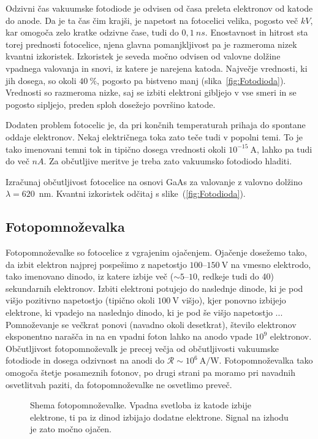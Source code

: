 Odzivni čas vakuumske fotodiode je odvisen od časa preleta elektronov od katode do anode. 
Da je ta čas čim krajši, je napetost na fotocelici velika, pogosto več $\si{kV}$,
kar omogoča zelo kratke odzivne čase, tudi do $0,1~\si{ns}$. 
Enostavnost in hitrost sta torej prednosti fotocelice, 
njena glavna pomanjkljivost pa je razmeroma nizek kvantni izkoristek. 
Izkoristek je seveda močno odvisen od valovne dolžine vpadnega valovanja in snovi, iz 
katere je narejena katoda. Največje vrednosti, ki jih dosega, so okoli $40~\%$, 
pogosto pa bistveno manj (slika~\ref{fig:Fotodioda}). 
Vrednosti so razmeroma nizke, saj se izbiti elektroni gibljejo v vse
smeri in se pogosto sipljejo, preden sploh dosežejo površino katode. 

Dodaten problem fotocelic je, da pri končnih temperaturah prihaja do spontane oddaje elektronov.
Nekaj električnega toka zato teče tudi v popolni temi. To je tako imenovani temni 
tok 
in tipično dosega vrednosti okoli $10^{-15}~\si{\ampere}$, lahko pa tudi do več $\si{nA}$. 
Za občutljive meritve je treba zato vakuumsko fotodiodo hladiti. 

\vskip1cm
\begin{definition}
Izračunaj občutljivost fotocelice na osnovi GaAs 
za valovanje z valovno dolžino $\lambda=620$~nm.
Kvantni izkoristek odčitaj s slike~(\ref{fig:Fotodioda}).
\end{definition}

\subsection*{Fotopomnoževalka}
Fotopomnoževalke so fotocelice z vgrajenim ojačenjem. Ojačenje dosežemo tako, da 
izbit elektron najprej pospešimo z napetostjo $100$--$150~\si{\volt}$ na vmesno elektrodo, 
tako imenovano dinodo, iz katere izbije več ($\sim 5$--$10$, redkeje tudi do 40) 
sekundarnih elektronov. Izbiti elektroni
potujejo do naslednje dinode, ki je pod višjo pozitivno napetostjo (tipično okoli $100~\si{\volt}$
višjo), kjer ponovno izbijejo elektrone, ki vpadejo na naslednjo dinodo, 
ki je pod še višjo napetostjo ... 
Pomnoževanje se večkrat ponovi (navadno okoli desetkrat),
število elektronov eksponentno narašča in na en vpadni foton lahko na anodo vpade $10^9$ elektronov. 
Občutljivost fotopomnoževalk je  precej večja od občutljivosti vakuumske fotodiode in
dosega odzivnost na anodi do $\mathcal{R}\sim 10^6~\si{\ampere/\watt}$.
Fotopomnoževalka tako omogoča štetje posameznih fotonov, po drugi strani pa moramo pri 
navadnih osvetlitvah paziti, da fotopomnoževalke ne osvetlimo preveč. 
\begin{figure}[h]
\centering
\def\svgwidth{80truemm} 

\caption{Shema fotopomnoževalke. Vpadna svetloba iz katode izbije elektrone, ti pa 
iz dinod izbijajo dodatne elektrone. Signal na izhodu je zato močno ojačen. }
\label{fig:PMT}
\end{figure}

